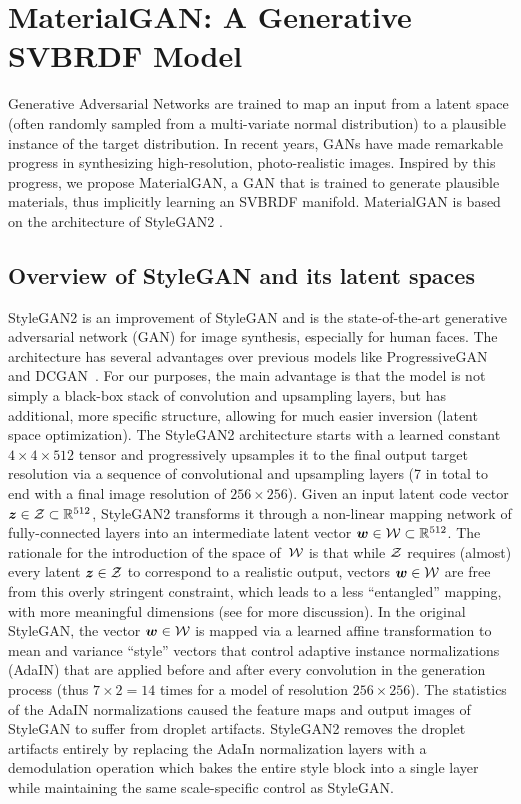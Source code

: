 \section{MaterialGAN: A Generative SVBRDF Model}
\label{sec:gan}
%
Generative Adversarial Networks \cite{Goodfellow2014} are trained to map an input from a latent space (often randomly sampled from a multi-variate normal distribution) to a plausible instance of the target distribution.
In recent years, GANs have made remarkable progress in synthesizing high-resolution, photo-realistic images. Inspired by this progress, we propose MaterialGAN, a GAN that is trained to generate plausible materials, thus implicitly learning an SVBRDF manifold. MaterialGAN is based on the architecture of StyleGAN2 \cite{StyleGAN2}.
%
\subsection{Overview of StyleGAN and its latent spaces}
\label{ssec:latent_space}
%
StyleGAN2 \cite{StyleGAN2} is an improvement of StyleGAN \cite{StyleGAN} and is the state-of-the-art generative adversarial network (GAN) for image synthesis, especially for human faces.
The architecture has several advantages over previous models like ProgressiveGAN~\cite{Karras2018} and DCGAN~\cite{DCGAN}. For our purposes, the main advantage is that the model is not simply a black-box stack of convolution and upsampling layers, but has additional, more specific structure, allowing for much easier inversion (latent space optimization).
%
The StyleGAN2 architecture starts with a learned constant $4 \times 4 \times 512$ tensor and progressively upsamples it to the final output target resolution via a sequence of convolutional and upsampling layers (7 in total to end with a final image resolution of $256 \times 256$).
Given an input latent code vector $\bm{z} \in \mathcal{Z} \subset \mathbb{R}^{512}$, StyleGAN2 transforms it through a non-linear mapping network of fully-connected layers into an intermediate latent vector $\bm{w} \in \mathcal{W} \subset \mathbb{R}^{512}$.
The rationale for the introduction of the space of~$\mathcal{W}$ is that while $\mathcal{Z}$ requires (almost) every latent $\bm{z} \in \mathcal{Z}$ to correspond to a realistic output, vectors $\bm{w} \in \mathcal{W}$ are free from this overly stringent constraint, which leads to a less ``entangled'' mapping, with more meaningful dimensions (see \cite{StyleGAN,StyleGAN2} for more discussion).
%
In the original StyleGAN, the vector $\bm{w} \in \mathcal{W}$ is mapped via a learned affine transformation to mean and variance ``style'' vectors that control adaptive instance normalizations (AdaIN) \cite{Huang2017} that are applied before and after every convolution in the generation process (thus $7 \times 2 = 14$ times for a model of resolution $256 \times 256$). The statistics of the AdaIN normalizations caused the feature maps and output images of StyleGAN to suffer from droplet artifacts. StyleGAN2 removes the droplet artifacts entirely by replacing the AdaIn normalization layers with a demodulation operation which bakes the entire style block into a single layer while maintaining the same scale-specific control as StyleGAN.
